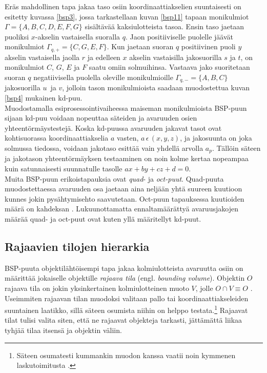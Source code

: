 ﻿\documentclass[a4paper, 12pt, titlepage]{article}
\begin{document}
Eräs mahdollinen tapa jakaa taso osiin koordinaattiakselien suuntaisesti on esitetty kuvassa \ref{bsp3}, jossa tarkastellaan kuvan \ref{bsp11} tapaan monikulmiot $\Gamma=\{A,B,C,D,E,F,G\}$ sisältävää kaksiulotteista tasoa. Ensin taso jaetaan puoliksi $x$-akselin vastaisella suoralla $q$. Jaon positiiviselle puolelle jäävät monikulmiot $\Gamma_{q,+} = \{C,G,E,F\}$. Kun jaetaan suoran $q$ positiivinen puoli $y$ akselin vastaisella jaolla $r$ ja edelleen $x$ akselin vastaisilla jakosuorilla $s$ ja $t$, on monikulmiot $C$, $G$, $E$ ja $F$ saatu omiin solmuihinsa. Vastaava jako suoritetaan suoran $q$ negatiivisella puolella oleville monikulmioille $\Gamma_{q,-} = \{A,B,C\}$ jakosuorilla $u$ ja $v$, jolloin tason monikulmioista saadaan muodostettua kuvan \ref{bsp4} mukainen kd-puu.\\ 

Muodostamalla esiprosessointivaiheessa maiseman monikulmioista BSP-puun sijaan kd-puu voidaan nopeuttaa säteiden ja avaruuden osien yhteentörmäystestejä. Koska kd-puussa avaruuden jakavat tasot ovat kohtisuorassa koordinaattiakselia $a$ vasten, $a\,\epsilon\,(x, y, z)$, ja jakosuunta on joka solmussa tiedossa, voidaan jakotaso esittää vain yhdellä arvolla $a_p$. Tällöin säteen ja jakotason yhteentörmäyksen testaaminen on noin kolme kertaa nopeampaa kuin satunnaisesti suunnatulle tasolle $ax + by + cz + d = 0$. \citep[.]{havran}\\



Muita BSP-puun erikoistapauksia ovat \emph{quad}- ja \emph{oct-puut}. Quad-puuta muodostettaessa avaruuden osa jaetaan aina neljään yhtä suureen kuutioon kunnes jokin pysähtymisehto saavutetaan. Oct-puun tapauksessa kuutioiden määrä on kahdeksan \citep[.]{samet}. Lukuunottamatta ennaltamäärättyä avaruusjakojen määrää quad- ja oct-puut ovat kuten yllä määritellyt kd-puut.

\subsection{Rajaavien tilojen hierarkia}

BSP-puuta objektilähtöisempi tapa jakaa kolmiulotteista avaruutta osiin on määrittää jokaiselle objektille \emph{rajaava tila} (engl. \emph{bounding volume}). Objektin $O$ rajaava tila on jokin yksinkertainen kolmiulotteinen muoto $V$, jolle $O \cap V \equiv O$ \citep{havran}. Useimmiten rajaavan tilan muodoksi valitaan pallo tai koordinaattiakseleiden suuntainen laatikko, sillä säteen osumista niihin on helppo testata.\footnote{Säteen osumatesti kummankin muodon kanssa vaatii noin kymmenen laskutoimitusta \citep{goldsmith}.} Rajaavat tilat tulisi valita siten, että ne rajaavat objekteja tarkasti, jättämättä liikaa tyhjää tilaa itsensä ja objektin väliin. \citep{hughes} \\
\end{document}
